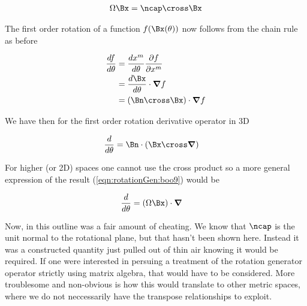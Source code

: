 \begin{align}\label{eqn:rotationGen:boo8}
\Omega \Bx = \ncap \cross \Bx
\end{align}

The first order rotation of a function $f(\Bx(\theta))$ now follows from the chain rule as before

\begin{align*}
\frac{df}{d\theta} 
&= 
\frac{d x^m}{d\theta} 
\frac{\partial f}{\partial x^m} 
\\
&= 
\frac{d \Bx}{d\theta} \cdot \spacegrad f
\\
&= 
(\Bn \cross \Bx) \cdot \spacegrad f
\\
\end{align*}

We have then for the first order rotation derivative operator in 3D

\begin{align}\label{eqn:rotationGen:boo9}
\frac{d}{d\theta} &= \Bn \cdot (\Bx \cross \spacegrad) 
\end{align}

For higher (or 2D) spaces one cannot use the cross product so a more general expression of the result (\ref{eqn:rotationGen:boo9}) would be

\begin{align}\label{eqn:rotationGen:boo10}
\frac{d}{d\theta} &= (\Omega \Bx) \cdot \spacegrad
\end{align}

Now, in this outline was a fair amount of cheating.  We know that $\ncap$ is the unit normal to the rotational plane, but that hasn't been shown here.  Instead it was a constructed quantity just pulled out of thin air knowing it would be required.  If one were interested in persuing a treatment of the rotation generator operator strictly using matrix algebra, that would have to be considered.  More troublesome and non-obvious is how this would translate to other metric spaces, where we do not neccessarily have the transpose relationships to exploit.

\EndArticle
